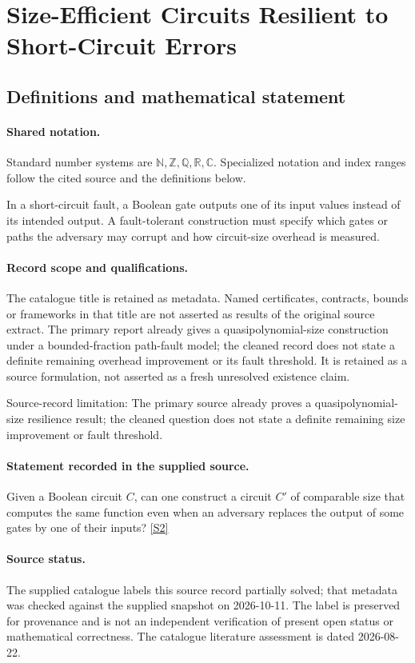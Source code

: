 \documentclass[11pt]{article}
\newcommand{\sref}[2]{\hyperlink{source:#1:#2}{[S#2]}}
\begin{document}
\section{Size-Efficient Circuits Resilient to Short-Circuit Errors}\label{statement}

\subsection{Definitions and mathematical statement}

\paragraph{Shared notation.}Standard number systems are $\mathbb N,\mathbb Z,\mathbb Q,\mathbb R,\mathbb C$. Specialized notation and index ranges follow the cited source and the definitions below.


In a short-circuit fault, a Boolean gate outputs one of its input values instead of its intended output. A fault-tolerant construction must specify which gates or paths the adversary may corrupt and how circuit-size overhead is measured.
\paragraph{Record scope and qualifications.}
The catalogue title is retained as metadata. Named certificates, contracts, bounds or frameworks in that title are not asserted as results of the original source extract.
The primary report already gives a quasipolynomial-size construction under a bounded-fraction path-fault model; the cleaned record does not state a definite remaining overhead improvement or its fault threshold. It is retained as a source formulation, not asserted as a fresh unresolved existence claim.

Source-record limitation: The primary source already proves a quasipolynomial-size resilience result; the cleaned question does not state a definite remaining size improvement or fault threshold.
\paragraph{Statement recorded in the supplied source.}
Given a Boolean circuit $C$, can one construct a circuit $C'$ of comparable size that computes the same function even when an adversary replaces the output of some gates by one of their inputs? \sref{statement}{2}
\paragraph{Source status.}
The supplied catalogue labels this source record partially solved; that metadata was checked against the supplied snapshot on 2026-10-11. The label is preserved for provenance and is not an independent verification of present open status or mathematical correctness. The catalogue literature assessment is dated 2026-08-22.
\end{document}
